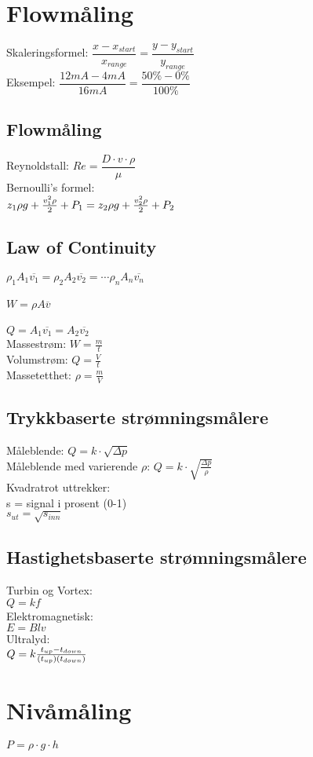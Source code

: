 \section{Flowmåling}
\vskip 2.5pt 
Skaleringsformel:
\vskip 2.5pt 
$\dfrac{x-x_{start}}{x_{range}}=\dfrac{y-y_{start}}{y_{range}}$\\
Eksempel: $\dfrac{12mA-4mA}{16mA}=\dfrac{50\%-0\%}{100\%}$
\vskip 2.5pt 
\subsection*{Flowmåling}
\vskip 2.5pt 
Reynoldstall: $Re=\dfrac {D \cdot v \cdot \rho}{\mu}$\\
\vskip 2.5pt 
Bernoulli's formel:\\
$z_1 \rho g + {v_1^2 \rho \over 2} + P_1 = z_2 \rho g + {v_2^2 \rho \over 2} + P_2$\\
\vskip 2.5pt 
\subsection*{Law of Continuity}
$\rho_1 A_1 \overline{v_1} = \rho_2 A_2 \overline{v_2} = \cdots \rho_n A_n \overline{v_n}$\\
\\
$W = \rho A \overline{v}$\\\\
$Q=A_1 \overline{v_1} = A_2 \overline{v_2}$\\

Massestrøm: $W=\frac{m}{t}$\\
\vskip 2.5pt 
Volumstrøm: $Q=\frac{V}{t}$\\
\vskip 2.5pt 
Massetetthet: $\rho=\frac{m}{V}$\\
\vskip 2.5pt 
\subsection*{Trykkbaserte strømningsmålere}
Måleblende: $Q=k\cdot \sqrt{\Delta p}$\\
\vskip 2.5pt 
Måleblende med varierende $\rho$: $Q=k\cdot \sqrt{\frac{\Delta p}{\rho}}$\\
\vskip 2.5pt
Kvadratrot uttrekker:\\
s = signal i prosent (0-1)\\
$s_{ut}=\sqrt{s_{inn}}$\\
\subsection*{Hastighetsbaserte strømningsmålere}
Turbin og Vortex:\\
$Q=kf$\\
Elektromagnetisk:\\
$E=Blv$\\
Ultralyd:\\
$Q = k {t_{up} - t_{down} \over (t_{up})(t_{down})}$\\
 
\section{Nivåmåling}

$P = \rho \cdot g \cdot h $\\
